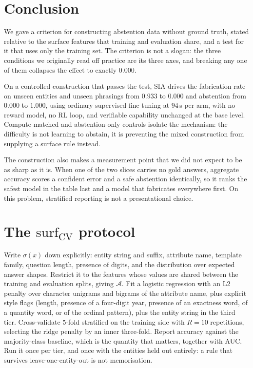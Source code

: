 \documentclass[11pt,a4paper]{article}
\newcommand{\surfcv}{$\mathrm{surf}_\mathrm{CV}$}
\begin{document}
\section{Conclusion}
\label{sec:conclusion}

We gave a criterion for constructing abstention data without ground truth,
stated relative to the surface features that training and evaluation share, and
a test for it that uses only the training set. The criterion is not a slogan:
the three conditions we originally read off practice are its three axes, and
breaking any one of them collapses the effect to exactly $0.000$.

On a controlled construction that passes the test, SIA drives the fabrication
rate on unseen entities and unseen phrasings from $0.933$ to $0.000$ and
abstention from $0.000$ to $1.000$, using ordinary supervised fine-tuning at
$94$\,s per arm, with no reward model, no RL loop, and verifiable capability
unchanged at the base level. Compute-matched and abstention-only controls
isolate the mechanism: the difficulty is not learning to abstain, it is
preventing the mixed construction from supplying a surface rule instead.

The construction also makes a measurement point that we did not expect to be as
sharp as it is. When one of the two slices carries no gold answers, aggregate
accuracy scores a confident error and a safe abstention identically, so it
ranks the safest model in the table last and a model that fabricates everywhere
first. On this problem, stratified reporting is not a presentational choice.

\appendix

\section{The \surfcv{} protocol}
\label{app:protocol}

Write $\sigma(x)$ down explicitly: entity string and suffix, attribute name,
template family, question length, presence of digits, and the distribution over
expected answer shapes. Restrict it to the features whose values are shared
between the training and evaluation splits, giving $\mathcal A$. Fit a logistic
regression with an L2 penalty over character unigrams and bigrams of the
attribute name, plus explicit style flags (length, presence of a four-digit
year, presence of an exactness word, of a quantity word, or of the ordinal
pattern), plus the entity string in the third tier. Cross-validate $5$-fold
stratified on the training side with $R=10$ repetitions, selecting the ridge
penalty by an inner three-fold. Report accuracy against the majority-class
baseline, which is the quantity that matters, together with AUC. Run it once
per tier, and once with the entities held out entirely: a rule that survives
leave-one-entity-out is not memorisation.
\end{document}
